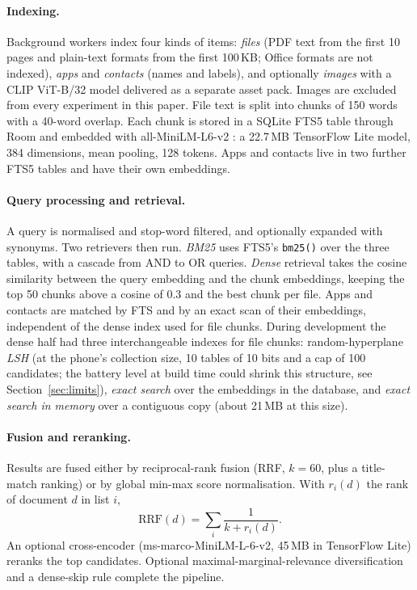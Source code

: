 \documentclass[pdflatex,sn-basic,Numbered]{sn-jnl}
\begin{document}
\paragraph{Indexing.} Background workers index four kinds of items: \emph{files} (PDF text from the first 10 pages and plain-text formats from the first 100\,KB; Office formats are not indexed), \emph{apps} and \emph{contacts} (names and labels), and optionally \emph{images} with a CLIP ViT-B/32 model delivered as a separate asset pack. Images are excluded from every experiment in this paper. File text is split into chunks of 150 words with a 40-word overlap. Each chunk is stored in a SQLite FTS5 table through Room and embedded with all-MiniLM-L6-v2 \citep{wang2020minilm}: a 22.7\,MB TensorFlow Lite model, 384 dimensions, mean pooling, 128 tokens. Apps and contacts live in two further FTS5 tables and have their own embeddings.

\paragraph{Query processing and retrieval.} A query is normalised and stop-word filtered, and optionally expanded with synonyms. Two retrievers then run. \emph{BM25} uses FTS5's \texttt{bm25()} over the three tables, with a cascade from AND to OR queries. \emph{Dense} retrieval takes the cosine similarity between the query embedding and the chunk embeddings, keeping the top 50 chunks above a cosine of 0.3 and the best chunk per file. Apps and contacts are matched by FTS and by an exact scan of their embeddings, independent of the dense index used for file chunks. During development the dense half had three interchangeable indexes for file chunks: random-hyperplane \emph{LSH} (at the phone's collection size, 10 tables of 10 bits and a cap of 100 candidates; the battery level at build time could shrink this structure, see Section~\ref{sec:limits}), \emph{exact search} over the embeddings in the database, and \emph{exact search in memory} over a contiguous copy (about 21\,MB at this size).

\paragraph{Fusion and reranking.} Results are fused either by reciprocal-rank fusion (RRF, $k=60$, plus a title-match ranking) or by global min-max score normalisation. With $r_i(d)$ the rank of document $d$ in list $i$,
\begin{equation}
\mathrm{RRF}(d) = \sum_{i} \frac{1}{k + r_i(d)}.
\end{equation}
An optional cross-encoder (ms-marco-MiniLM-L-6-v2, 45\,MB in TensorFlow Lite) reranks the top candidates. Optional maximal-marginal-relevance diversification and a dense-skip rule complete the pipeline.
\end{document}
